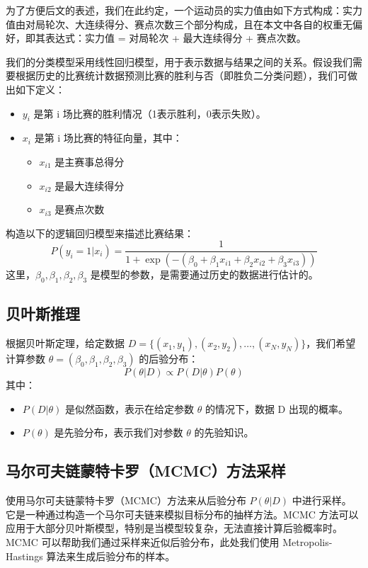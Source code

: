 \documentclass[12pt]{article}
\begin{document}
为了方便后文的表述，我们在此约定，一个运动员的实力值由如下方式构成：实力值由对局轮次、大连续得分、赛点次数三个部分构成，且在本文中各自的权重无偏好，即其表达式：实力值 = 对局轮次 + 最大连续得分 + 赛点次数。


我们的分类模型采用线性回归模型，用于表示数据与结果之间的关系。假设我们需要根据历史的比赛统计数据预测比赛的胜利与否（即胜负二分类问题），我们可做出如下定义：
\begin{itemize}
	\item $y_{i}$ 是第 i 场比赛的胜利情况（1表示胜利，0表示失败）。
	\item $x_{i}$ 是第 i 场比赛的特征向量，其中：
	\begin{itemize}
		\item $x_{i1}$ 是主赛事总得分
		\item $x_{i2}$ 是最大连续得分
		\item $x_{i3}$ 是赛点次数
	\end{itemize}
\end{itemize}
构造以下的逻辑回归模型来描述比赛结果：
\begin{equation}
    P(y_i=1|x_i)=\frac{1}{1+\exp(-(\beta_0+\beta_1x_{i1}+\beta_2x_{i2}+\beta_3x_{i3}))}
\end{equation}
这里，$\beta_0,\beta_1,\beta_2,\beta_3$ 是模型的参数，是需要通过历史的数据进行估计的。

\subsection{贝叶斯推理}
根据贝叶斯定理，给定数据 $D=\{(x_1,y_1),(x_2,y_2),\ldots,(x_N,y_N)\}$，我们希望计算参数 $\theta=(\beta_0,\beta_1,\beta_2,\beta_3)$ 的后验分布：
\begin{equation}
    P(\theta|D)\propto P(D|\theta)P(\theta)
\end{equation}
其中：
\begin{itemize}
	\item $P(D|\theta)$ 是似然函数，表示在给定参数 $\theta$ 的情况下，数据 D 出现的概率。
	\item $P(\theta)$ 是先验分布，表示我们对参数 $\theta$ 的先验知识。
\end{itemize}


\subsection{马尔可夫链蒙特卡罗（MCMC）方法采样}
使用马尔可夫链蒙特卡罗（MCMC）方法来从后验分布 $P(\theta|D)$ 中进行采样。
它是一种通过构造一个马尔可夫链来模拟目标分布的抽样方法。MCMC 方法可以应用于大部分贝叶斯模型，特别是当模型较复杂，无法直接计算后验概率时。MCMC 可以帮助我们通过采样来近似后验分布，此处我们使用 Metropolis-Hastings 算法来生成后验分布的样本。
\end{document}
